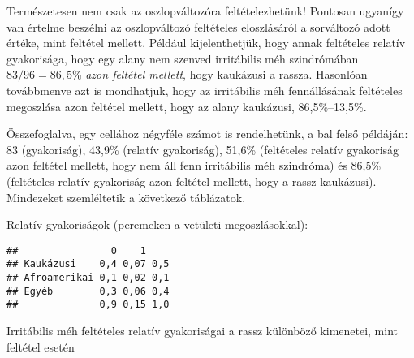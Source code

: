 \documentclass[]{book}
\newenvironment{Shaded}{\begin{snugshade}}{\end{snugshade}}
\newcommand{\KeywordTok}[1]{\textcolor[rgb]{0.13,0.29,0.53}{\textbf{#1}}}
\newcommand{\DecValTok}[1]{\textcolor[rgb]{0.00,0.00,0.81}{#1}}
\newcommand{\StringTok}[1]{\textcolor[rgb]{0.31,0.60,0.02}{#1}}
\newcommand{\OperatorTok}[1]{\textcolor[rgb]{0.81,0.36,0.00}{\textbf{#1}}}
\newcommand{\NormalTok}[1]{#1}
\begin{document}
Természetesen nem csak az oszlopváltozóra feltételezhetünk! Pontosan
ugyanígy van értelme beszélni az oszlopváltozó feltételes eloszlásáról a
sorváltozó adott értéke, mint feltétel mellett. Például kijelenthetjük,
hogy annak feltételes relatív gyakorisága, hogy egy alany nem szenved
irritábilis méh szindrómában \(83/96=86,\!5\)\% \emph{azon feltétel
mellett}, hogy kaukázusi a rassza. Hasonlóan továbbmenve azt is
mondhatjuk, hogy az irritábilis méh fennállásának feltételes megoszlása
azon feltétel mellett, hogy az alany kaukázusi, 86,5\%--13,5\%.

Összefoglalva, egy cellához négyféle számot is rendelhetünk, a bal felső
példáján: 83 (gyakoriság), 43,9\% (relatív gyakoriság), 51,6\%
(feltételes relatív gyakoriság azon feltétel mellett, hogy nem áll fenn
irritábilis méh szindróma) és 86,5\% (feltételes relatív gyakoriság azon
feltétel mellett, hogy a rassz kaukázusi). Mindezeket szemléltetik a
következő táblázatok.

Relatív gyakoriságok (peremeken a vetületi megoszlásokkal):

\begin{Shaded}
\end{Shaded}

\begin{verbatim}
##                0    1    
## Kaukázusi    0,4 0,07 0,5
## Afroamerikai 0,1 0,02 0,1
## Egyéb        0,3 0,06 0,4
##              0,9 0,15 1,0
\end{verbatim}

Irritábilis méh feltételes relatív gyakoriságai a rassz különböző
kimenetei, mint feltétel esetén

\begin{Shaded}
\end{Shaded}
\end{document}
